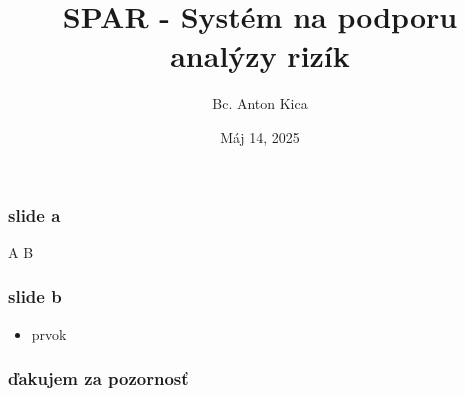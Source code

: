 \documentclass[11pt,xcolor={dvipsnames},hyperref={pdftex,pdfpagemode=UseNone,hidelinks,pdfdisplaydoctitle=true},usepdftitle=false]{beamer}
\title[SPAR]{SPAR - Systém na podporu analýzy rizík}
\author[A.~Kica]{Bc. Anton Kica}
\institute[FMFI]{FMFI\\Univerzita Komenského v Bratislave}
\date{Máj 14, 2025}
\begin{document}
\maketitle
\sepframe[title={Obsah}]

\begin{frame}
  \frametitle{slide a}

  \begin{multicols}{2}
    A
    \columnbreak
    B
  \end{multicols}
\end{frame}
\begin{frame}
  \frametitle{slide b}
  \begin{itemize}
    \item prvok
  \end{itemize}
\end{frame}

%

\begin{frame}
  \frametitle{ďakujem za pozornosť}
\end{frame}
\end{document}
